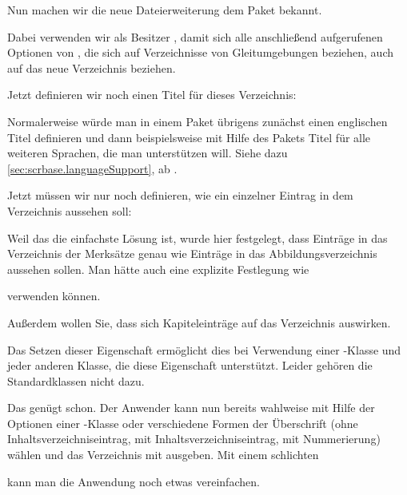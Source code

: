 Nun machen wir die neue Dateierweiterung dem Paket
 bekannt.
\begin{lstcode}
\end{lstcode}
Dabei verwenden wir als Besitzer , damit sich alle
anschließend aufgerufenen Optionen von \KOMAScript, die sich auf Verzeichnisse
von Gleitumgebungen beziehen, auch auf das neue Verzeichnis beziehen.

Jetzt definieren wir noch einen Titel für dieses
Verzeichnis:
\begin{lstcode}
  \newcommand*{\listoflorname}{Verzeichnis der Merksätze}
\end{lstcode}
Normalerweise würde man in einem Paket übrigens zunächst einen englischen
Titel definieren und dann beispielsweise mit Hilfe des Pakets
 Titel für alle weiteren Sprachen, die man unterstützen
will. Siehe dazu \autoref{sec:scrbase.languageSupport}, ab
.

Jetzt müssen wir nur
noch definieren, wie ein einzelner Eintrag in dem Verzeichnis aussehen soll:
\begin{lstcode}
  \newcommand*{\l@remarkbox}{\l@figure}
\end{lstcode}
Weil das die einfachste Lösung ist, wurde hier festgelegt, dass Einträge in
das Verzeichnis der Merksätze genau wie Einträge in das Abbildungsverzeichnis
aussehen sollen. Man hätte auch eine explizite Festlegung wie
\begin{lstcode}
\end{lstcode}
verwenden können.

Außerdem wollen Sie, dass sich Kapiteleinträge auf das
Verzeichnis auswirken.
\begin{lstcode}
\end{lstcode}
Das Setzen dieser Eigenschaft ermöglicht dies bei Verwendung einer
\KOMAScript-Klasse und jeder anderen Klasse, die diese Eigenschaft
unterstützt. Leider gehören die Standardklassen nicht dazu.

Das genügt schon. Der Anwender kann nun bereits
wahlweise mit Hilfe der Optionen einer \KOMAScript-Klasse oder
 verschiedene Formen der Überschrift (ohne
Inhaltsverzeichniseintrag, mit Inhaltsverzeichniseintrag, mit Nummerierung)
wählen und das Verzeichnis mit
 ausgeben. Mit einem
schlichten
\begin{lstcode}
  \newcommand*{\listofremarkboxes}{\listoftoc{lor}}
\end{lstcode}
kann man die Anwendung noch etwas vereinfachen.

